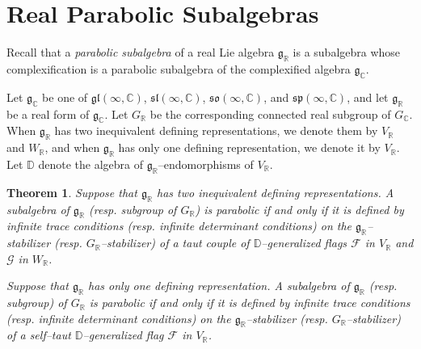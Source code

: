 \documentclass[oneside,leqno,11pt]{article}
\def\gg{\mathfrak{g}}
\def\ggl{\mathfrak{gl}}
\def\gsl{\mathfrak{sl}}
\def\gso{\mathfrak{so}}
\def\gsp{\mathfrak{sp}}
\def\C{\mathbb{C}}
\def\D{\mathbb{D}}
\def\R{\mathbb{R}}
\def\cF{\mathcal{F}}
\def\cG{\mathcal{G}}
\newtheorem{theorem}[equation]{Theorem}
\begin{document}
\section{Real Parabolic Subalgebras}
\label{sec3}
\setcounter{equation}{0}

Recall that  a \emph{parabolic subalgebra} of a real Lie algebra $\gg_\R$
is a subalgebra whose complexification is a parabolic subalgebra of the
complexified algebra $\gg_\C$. 

Let $\gg_\C$ be one of
$\ggl(\infty,\C)$, $\gsl(\infty,\C)$, $\gso(\infty,\C)$, and $\gsp(\infty,\C)$,
and let $\gg_\R$ be a real form of $\gg_\C$.  Let $G_\R$ be the corresponding connected real subgroup of $G_\C$.
When $\gg_\R$ has two inequivalent defining representations, we denote them by $V_\R$ and $W_\R$, and when $\gg_\R$ has only one defining representation, we denote it by $V_\R$.  Let $\D$ denote the algebra of $\gg_\R$--endomorphisms of $V_\R$.  


\begin{theorem} \label{real-parab}
Suppose that $\gg_\R$ has two inequivalent defining representations.
A subalgebra of $\gg_\R$ (resp. subgroup of $G_\R$) is 
parabolic if and only if it is defined by infinite trace conditions 
(resp. infinite determinant conditions) on the 
$\gg_\R$--stabilizer (resp. $G_\R$--stabilizer) of 
a taut couple of $\D$--generalized flags $\cF$ in $V_\R$ and $\cG$ in $W_\R$.

Suppose that $\gg_\R$ has only one defining representation.
A subalgebra of $\gg_\R$ (resp. subgroup) of $G_\R$ is 
parabolic if and only if it is defined by infinite trace conditions 
(resp. infinite determinant conditions) on the 
$\gg_\R$--stabilizer (resp. $G_\R$--stabilizer) of 
a self--taut $\D$--generalized flag $\cF$ in $V_\R$.
\end{theorem}
\end{document}
